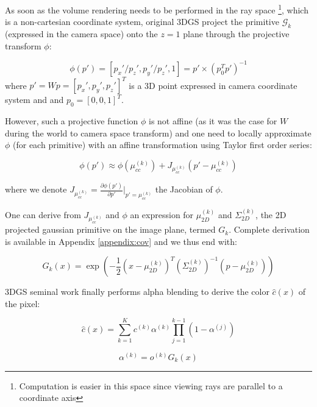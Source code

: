 As soon as the volume rendering needs to be performed in the ray space \footnote{Computation is easier in this space since viewing rays are parallel to a coordinate axis}, which is a non-cartesian coordinate system, original 3D\ac{GS} project the primitive $\mathcal{G}_{k}$ (expressed in the camera space) onto the $z=1$ plane through the projective transform $\phi$: 

\begin{equation}
  \phi(p') = [p_{x}'/p_{z}',p_{y}'/p_{z}',1] = p'\times(p_{0}^{T}p')^{-1}
\end{equation}
where $p'=Wp = [p_{x}',p_{y}',p_{z}']^{T}$ is a 3D point expressed in camera coordinate system and and $p_{0} = [0, 0, 1]^{T}$. \newline

However, such a projective function $\phi$ is not affine (as it was the case for $W$ during the world to camera space transform) and one need to locally approximate $\phi$ (for each primitive) with an affine transformation using Taylor first order series: 

\begin{equation}
  \label{eq:affine_transform}
  \phi(p') \approx \phi(\mu_{cc}^{(k)}) + J_{\mu_{cc}^{(k)}}(p' - \mu_{cc}^{(k)})
\end{equation}

\noindent where we denote $J_{\mu_{cc}^{(k)}} =  \frac{\partial \phi(p')}{\partial p'}|_{p' = \mu_{cc}^{(k)}}$ the Jacobian of $\phi$. 

One can derive from $J_{\mu_{cc}^{(k)}}$ and $\phi$ an expression for $\mu^{(k)}_{2D}$ and $\Sigma^{(k)}_{2D}$, the 2D projected gaussian primitive on the image plane, termed $G_{k}$. Complete derivation is available in Appendix \ref{appendix:cov} and we thus end with: 

\begin{equation}
  G_{k}(x) = \exp(-\frac{1}{2}(x-\mu^{(k)}_{2D})^{T}(\Sigma^{(k)}_{2D})^{-1}(p-\mu^{(k)}_{2D}))
\end{equation}

3D\ac{GS} seminal work \citep{kerbl20233d} finally performs alpha blending to derive the color $\hat{c}(x)$ of the pixel: 

\begin{equation}
\label{eq:gs-alpha-blending}
  \hat{c}(x) = \sum_{k=1}^{K}c^{(k)}\alpha^{(k)}\prod_{j=1}^{k-1}(1-\alpha^{(j)})
\end{equation}

\begin{equation}
\label{eq:gs-alpha-def}
  \alpha^{(k)} = o^{(k)}G_{k}(x)
\end{equation}


